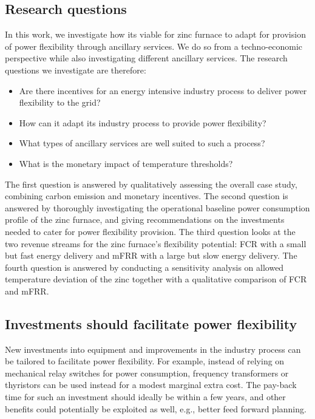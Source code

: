 \documentclass[lettersize,journal]{IEEEtran}
\begin{document}
\subsection{Research questions}

In this work, we investigate how its viable for zinc furnace to adapt for provision of power flexibility through ancillary services. We do so from a techno-economic perspective while also investigating different ancillary services. The research questions we investigate are therefore:

\IEEEpubidadjcol

\begin{itemize}
    \item Are there incentives for an energy intensive industry process to deliver power flexibility to the grid?
    \item How can it adapt its industry process to provide power flexibility?
    \item What types of ancillary services are well suited to such a process?
    \item What is the monetary impact of temperature thresholds?
\end{itemize}

The first question is answered by qualitatively assessing the overall case study, combining carbon emission and monetary incentives. The second question is answered by thoroughly investigating the operational baseline power consumption profile of the zinc furnace, and giving recommendations on the investments needed to cater for power flexibility provision. The third question looks at the two revenue streams for the zinc furnace's flexibility potential: FCR with a small but fast energy delivery and mFRR with a large but slow energy delivery. The fourth question is answered by conducting a sensitivity analysis on allowed temperature deviation of the zinc together with a qualitative comparison of FCR and mFRR.


\subsection{Investments should facilitate power flexibility}

New investments into equipment and improvements in the industry process can be tailored to facilitate power flexibility. For example, instead of relying on mechanical relay switches for power consumption, frequency transformers or thyristors can be used instead for a modest marginal extra cost. The pay-back time for such an investment should ideally be within a few years, and other benefits could potentially be exploited as well, e.g., better feed forward planning.
\end{document}
